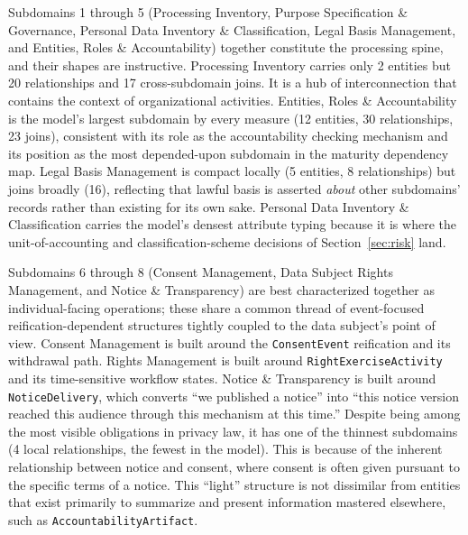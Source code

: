\documentclass[10pt,letterpaper,twocolumn,twoside]{rho-class/rho}
\begin{document}
Subdomains 1 through 5 (Processing Inventory, Purpose Specification \& Governance, Personal Data Inventory \& Classification, Legal Basis Management, and Entities, Roles \& Accountability) together constitute the processing spine, and their shapes are instructive. Processing Inventory carries only 2 entities but 20 relationships and 17 cross-subdomain joins. It is a hub of interconnection that contains the context of organizational activities. Entities, Roles \& Accountability is the model's largest subdomain by every measure (12 entities, 30 relationships, 23 joins), consistent with its role as the accountability checking mechanism and its position as the most depended-upon subdomain in the maturity dependency map. Legal Basis Management is compact locally (5 entities, 8 relationships) but joins broadly (16), reflecting that lawful basis is asserted \emph{about} other subdomains' records rather than existing for its own sake. Personal Data Inventory \& Classification carries the model's densest attribute typing because it is where the unit-of-accounting and classification-scheme decisions of Section~\ref{sec:risk} land.

Subdomains 6 through 8 (Consent Management, Data Subject Rights Management, and Notice \& Transparency) are best characterized together as individual-facing operations; these share a common thread of event-focused reification-dependent structures tightly coupled to the data subject's point of view. Consent Management is built around the \texttt{ConsentEvent} reification and its withdrawal path. Rights Management is built around \texttt{RightExerciseActivity} and its time-sensitive workflow states. Notice \& Transparency is built around \texttt{NoticeDelivery}, which converts ``we published a notice'' into ``this notice version reached this audience through this mechanism at this time.'' Despite being among the most visible obligations in privacy law, it has one of the thinnest subdomains (4 local relationships, the fewest in the model). This is because of the inherent relationship between notice and consent, where consent is often given pursuant to the specific terms of a notice. This ``light'' structure is not dissimilar from entities that exist primarily to summarize and present information mastered elsewhere, such as \texttt{AccountabilityArtifact}.
\end{document}

